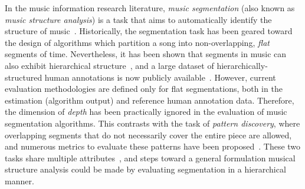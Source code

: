 \documentclass{article}
\begin{document}
In the music information research literature, \emph{music segmentation} (also known as \emph{music structure analysis}) is a task that aims to automatically identify the structure of music~\cite{Paulus2010}.
Historically, the segmentation task has been geared toward the design of algorithms which partition a song into non-overlapping, \emph{flat} segments of time.
Nevertheless, it has been shown that segments in music can also exhibit hierarchical
structure~\cite{Peeters2009}, and a large dataset of hierarchically-structured human annotations is now publicly available~\cite{Smith2011}.
However, current evaluation methodologies are defined only for flat segmentations, both in the estimation (algorithm output) and reference human annotation data.
Therefore, the dimension of \emph{depth} has been practically ignored in the evaluation of music segmentation algorithms.
This contrasts with the task of \emph{pattern discovery}, where overlapping segments that do not necessarily cover the entire piece are allowed, and numerous metrics to evaluate these patterns have been proposed~\cite{Collins2013}.
These two tasks share multiple attributes~\cite{Nieto2014_Motives}, and steps toward a general formulation musical structure analysis could be made by evaluating segmentation in 
a hierarchical manner.

\end{document}
